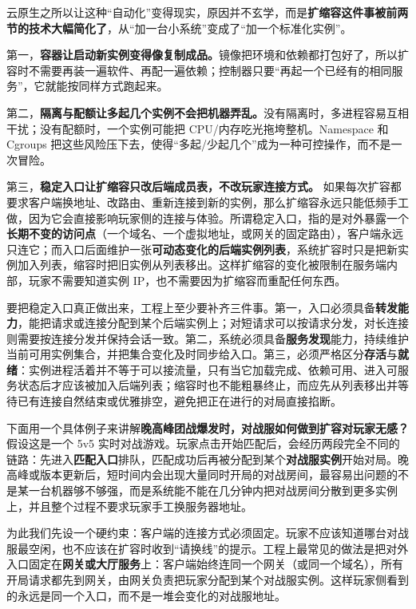 云原生之所以让这种“自动化”变得现实，原因并不玄学，而是\textbf{扩缩容这件事被前两节的技术大幅简化了}，从“加一台小系统”变成了“加一个标准化实例”。

第一，\textbf{容器让启动新实例变得像复制成品。}镜像把环境和依赖都打包好了，所以扩容时不需要再装一遍软件、再配一遍依赖；控制器只要“再起一个已经有的相同服务”，它就能按同样方式跑起来。

第二，\textbf{隔离与配额让多起几个实例不会把机器弄乱。}没有隔离时，多进程容易互相干扰；没有配额时，一个实例可能把 CPU/内存吃光拖垮整机。Namespace 和 Cgroups 把这些风险压下去，使得“多起/少起几个”成为一种可控操作，而不是一次冒险。

第三，\textbf{稳定入口让扩缩容只改后端成员表，不改玩家连接方式。}
如果每次扩容都要求客户端换地址、改路由、重新连接到新的实例，那么扩缩容永远只能低频手工做，因为它会直接影响玩家侧的连接与体验。所谓稳定入口，指的是对外暴露一个\textbf{长期不变的访问点}（一个域名、一个虚拟地址，或网关的固定路由），客户端永远只连它；而入口后面维护一张\textbf{可动态变化的后端实例列表}，系统扩容时只是把新实例加入列表，缩容时把旧实例从列表移出。这样扩缩容的变化被限制在服务端内部，玩家不需要知道实例 IP，也不需要因为扩缩容而重配任何东西。

要把稳定入口真正做出来，工程上至少要补齐三件事。第一，入口必须具备\textbf{转发能力}，能把请求或连接分配到某个后端实例上；对短请求可以按请求分发，对长连接则需要按连接分发并保持会话一致。第二，系统必须具备\textbf{服务发现}能力，持续维护当前可用实例集合，并把集合变化及时同步给入口。第三，必须严格区分\textbf{存活}与\textbf{就绪}：实例进程活着并不等于可以接流量，只有当它加载完成、依赖可用、进入可服务状态后才应该被加入后端列表；缩容时也不能粗暴终止，而应先从列表移出并等待已有连接自然结束或优雅排空，避免把正在进行的对局直接掐断。

下面用一个具体例子来讲解\textbf{晚高峰团战爆发时，对战服如何做到扩容对玩家无感？}
假设这是一个 5v5 实时对战游戏。玩家点击开始匹配后，会经历两段完全不同的链路：先进入\textbf{匹配入口}排队，匹配成功后再被分配到某个\textbf{对战服实例}开始对局。晚高峰或版本更新后，短时间内会出现大量同时开局的对战房间，最容易出问题的不是某一台机器够不够强，而是系统能不能在几分钟内把对战房间分散到更多实例上，并且整个过程不要求玩家手工换服务器地址。

为此我们先设一个硬约束：客户端的连接方式必须固定。玩家不应该知道哪台对战服最空闲，也不应该在扩容时收到“请换线”的提示。工程上最常见的做法是把对外入口固定在\textbf{网关或大厅服务}上：客户端始终连同一个网关（或同一个域名），所有开局请求都先到网关，由网关负责把玩家分配到某个对战服实例。这样玩家侧看到的永远是同一个入口，而不是一堆会变化的对战服地址。

